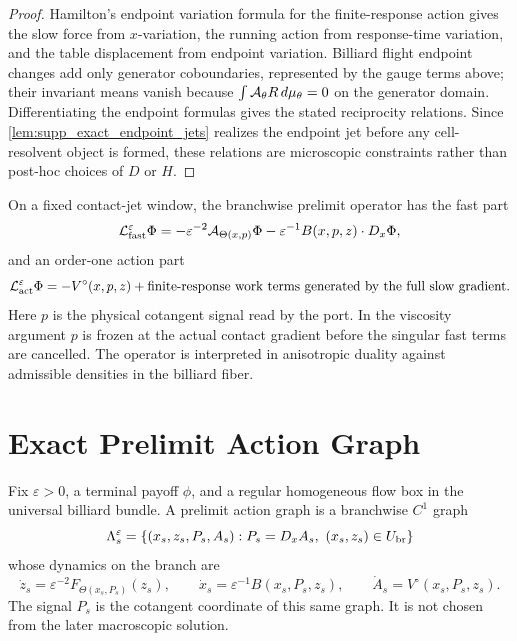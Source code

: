 \begin{proof}
Hamilton's endpoint variation formula for the finite-response action gives the
slow force from \(x\)-variation, the running action from response-time
variation, and the table displacement from endpoint variation.  Billiard
flight endpoint changes add only generator coboundaries, represented by the
gauge terms above; their invariant means vanish because
\(\int\mathcal A_\theta R\,d\mu_\theta=0\) on the generator domain.  Differentiating
the endpoint formulas gives the stated reciprocity relations.  Since
\cref{lem:supp_exact_endpoint_jets} realizes the endpoint jet before any
cell-resolvent object is formed, these relations are microscopic constraints
rather than post-hoc choices of \(D\) or \(H\).
\end{proof}

\begin{definition}
\label{def:supp_prelimit_operator}
On a fixed contact-jet window, the branchwise prelimit operator has the fast
part
\[
  \mathcal L^\varepsilon_{\rm fast}\Phi
  =
  -\varepsilon^{-2}\mathcal A_{\Theta(x,p)}\Phi
  -\varepsilon^{-1}B(x,p,z)\cdot D_x\Phi ,
\]
and an order-one action part
\[
  \mathcal L^\varepsilon_{\rm act}\Phi
  =
  -V^\circ(x,p,z)
  +\text{finite-response work terms generated by the full slow gradient}.
\]
Here \(p\) is the physical cotangent signal read by the port.  In the viscosity
argument \(p\) is frozen at the actual contact gradient before the singular
fast terms are cancelled.  The operator is interpreted in anisotropic duality
against admissible densities in the billiard fiber.
\end{definition}

\section{Exact Prelimit Action Graph}

\begin{definition}
\label{def:supp_branchwise_action_graph}
Fix \(\varepsilon>0\), a terminal payoff \(\phi\), and a regular homogeneous
flow box in the universal billiard bundle.  A prelimit action graph is a
branchwise \(C^1\) graph
\[
  \Lambda_s^\varepsilon
  =
  \{(x_s,z_s,P_s,A_s):P_s=D_xA_s,\ (x_s,z_s)\in U_{\rm br}\}
\]
whose dynamics on the branch are
\[
  \dot z_s=\varepsilon^{-2}F_{\Theta(x_s,P_s)}(z_s),\qquad
  \dot x_s=\varepsilon^{-1}B(x_s,P_s,z_s),\qquad
  \dot A_s=V^\circ(x_s,P_s,z_s).
\]
The signal \(P_s\) is the cotangent coordinate of this same graph.  It is not
chosen from the later macroscopic solution.
\end{definition}

